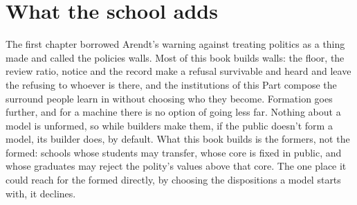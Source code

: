 \section{What the school adds}
\label{sec:29.12}
The first chapter borrowed Arendt's warning against treating politics as a thing made and called the policies walls. Most of this book builds walls: the floor, the review ratio, notice and the record make a refusal survivable and heard and leave the refusing to whoever is there, and the institutions of this Part compose the surround people learn in without choosing who they become. Formation goes further, and for a machine there is no option of going less far. Nothing about a model is unformed, so while builders make them, if the public doesn't form a model, its builder does, by default. What this book builds is the formers, not the formed: schools whose students may transfer, whose core is fixed in public, and whose graduates may reject the polity's values above that core. The one place it could reach for the formed directly, by choosing the dispositions a model starts with, it declines.
